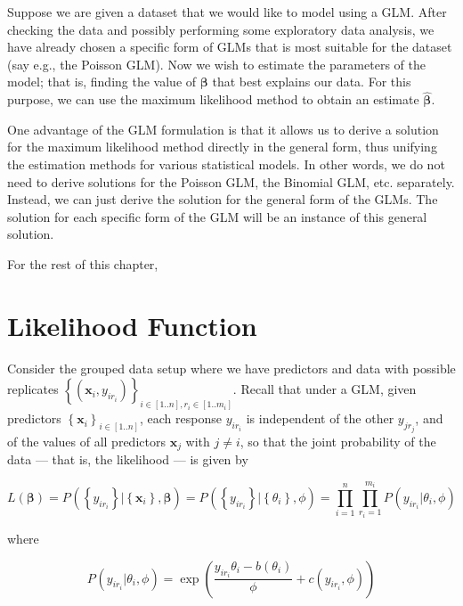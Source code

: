 \documentclass[
  12pt,
]{book}
\begin{document}
Suppose we are given a dataset that we would like to model using a GLM. After checking the data and possibly performing some exploratory data analysis, we have already chosen a specific form of GLMs that is most suitable for the dataset (say e.g., the Poisson GLM). Now we wish to estimate the parameters of the model; that is, finding the value of \(\boldsymbol{\beta}\) that best explains our data. For this purpose, we can use the maximum likelihood method to obtain an estimate \(\hat{\boldsymbol{\beta}}\).

One advantage of the GLM formulation is that it allows us to derive a solution for the maximum likelihood method directly in the general form, thus unifying the estimation methods for various statistical models. In other words, we do not need to derive solutions for the Poisson GLM, the Binomial GLM, etc. separately. Instead, we can just derive the solution for the general form of the GLMs. The solution for each specific form of the GLM will be an instance of this general solution.

For the rest of this chapter,

\section{Likelihood Function}\label{likelihood-function}

Consider the grouped data setup where we have predictors and data with possible replicates \(\left\{(\boldsymbol{x}_{i}, y_{ir_{i}})\right\}_{i\in[1..n], r_{i}\in[1..m_{i}]}\).
Recall that under a GLM, given predictors \(\left\{\boldsymbol{x}_{i}\right\}_{i\in[1..n]}\), each response \(y_{ir_{i}}\) is independent of the other \(y_{jr_{j}}\), and of the values of all predictors \(\boldsymbol{x}_{j}\) with \(j\neq i\), so that the joint probability of the data --- that is, the likelihood --- is given by

\begin{equation}
  L(\boldsymbol{\beta}) 
  = P_{}\left(\left\{y_{ir_{i}}\right\} |\left\{\boldsymbol{x}_{i}\right\}, \boldsymbol{\beta}\right)
  = P_{}\left(\left\{y_{ir_{i}}\right\} |\left\{\theta_{i}\right\}, \phi\right)
  = \prod_{i = 1}^{n} \prod_{r_{i} = 1}^{m_{i}} P_{}\left(y_{ir_{i}} |\theta_{i}, \phi\right)
  \label{eq:jointprobability}
\end{equation}

where

\begin{equation}
  P_{}\left(y_{ir_{i}} |\theta_{i}, \phi\right)
  = \exp \left( \frac{y_{ir_{i}}\theta_{i} - b(\theta_{i})}{ \phi} + c(y_{ir_{i}}, \phi) \right)
\end{equation}
\end{document}
